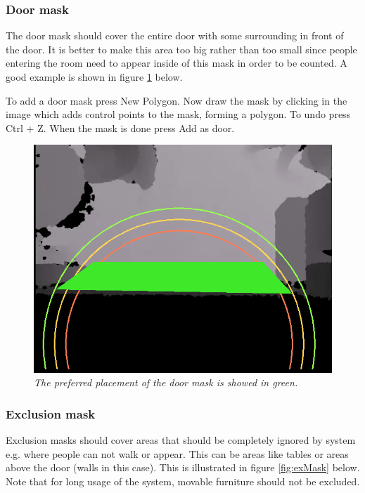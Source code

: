 \newpage
\subsubsection{Door mask}
The door mask should cover the entire door with some surrounding in front of the door. It is better to make this area too big rather than too small since people entering the room need to appear inside of this mask in order to be counted. A good example is shown in figure \ref{fig:doorMask} below. 

To add a door mask press New Polygon. Now draw the mask by clicking in the image which adds control points to the mask, forming a polygon. To undo press Ctrl + Z. When the mask is done press Add as door.

\begin{figure}[H]
	\centering
	\includegraphics[width=\linewidth]{images/Manual3.png}
	\caption[Exclusion mask]{\textit{The preferred placement of the door mask is showed in green.}}
	\label{fig:doorMask}  %
\end{figure}

\newpage
\subsubsection{Exclusion mask}
Exclusion masks should cover areas that should be completely ignored by system e.g. where people can not walk or appear. This can be areas like tables or areas above the door (walls in this case). This is illustrated in figure \ref{fig:exMask} below. Note that for long usage of the system, movable furniture should not be excluded.

